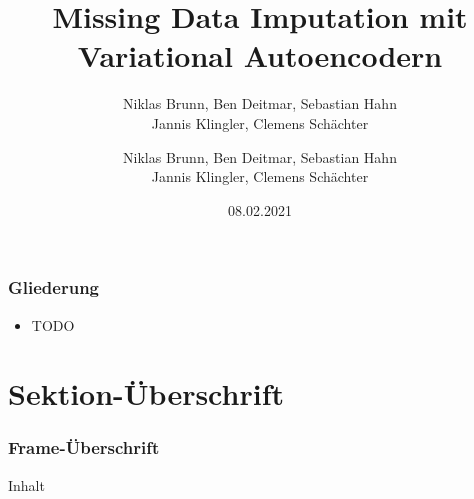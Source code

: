 \documentclass{beamer}
\title[TODO1]{Missing Data Imputation mit \\Variational Autoencodern}
\author[TODO2]{Niklas Brunn, Ben Deitmar, Sebastian Hahn\\Jannis Klingler, Clemens Schächter}
\date{08.02.2021}
\begin{document}
	
	\begin{frame}
		\titlepage
	\end{frame}
	
	\begin{frame}
		\frametitle{Gliederung}
		\begin{itemize}
			\item TODO
		\end{itemize}
	\end{frame}


	\section{Sektion-Überschrift}
	
	\begin{frame}
		\frametitle{Frame-Überschrift}
		Inhalt
	\end{frame}
	
	
	
	
	
	


	\author[TODO2]{Niklas Brunn, Ben Deitmar, Sebastian Hahn\\Jannis Klingler, Clemens Schächter}
	
\end{document}

